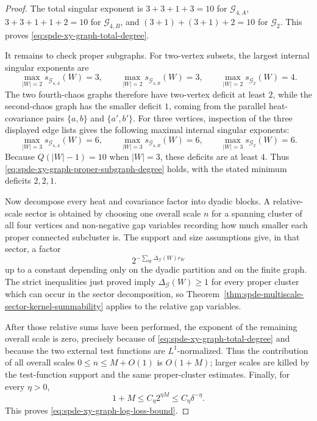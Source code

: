 \begin{proof}
The total singular exponent is \(3+3+1+3=10\) for
\(\mathcal G_{4,A}\), \(3+3+1+1+2=10\) for \(\mathcal G_{4,B}\), and
\((3+1)+(3+1)+2=10\) for \(\mathcal G_2\).  This proves
\eqref{eq:spde-xy-graph-total-degree}.

It remains to check proper subgraphs.  For two-vertex subsets, the largest
internal singular exponents are
\[
  \max_{|W|=2}s_{\mathcal G_{4,A}}(W)=3,\qquad
  \max_{|W|=2}s_{\mathcal G_{4,B}}(W)=3,\qquad
  \max_{|W|=2}s_{\mathcal G_2}(W)=4 .
\]
The two fourth-chaos graphs therefore have two-vertex deficit at least \(2\),
while the second-chaos graph has the smaller deficit \(1\), coming from the
parallel heat-covariance pairs \(\{a,b\}\) and \(\{a',b'\}\).  For three
vertices, inspection of the three displayed edge lists gives the following
maximal internal singular exponents:
\[
  \max_{|W|=3}s_{\mathcal G_{4,A}}(W)=6,\qquad
  \max_{|W|=3}s_{\mathcal G_{4,B}}(W)=6,\qquad
  \max_{|W|=3}s_{\mathcal G_2}(W)=6 .
\]
Because \(Q(|W|-1)=10\) when \(|W|=3\), these deficits are at least \(4\).
Thus \eqref{eq:spde-xy-graph-proper-subgraph-degree} holds, with the stated
minimum deficits \(2,2,1\).

Now decompose every heat and covariance factor into dyadic blocks.  A
relative-scale sector is obtained by choosing one overall scale \(n\) for a
spanning cluster of all four vertices and non-negative gap variables
recording how much smaller each proper connected subcluster is.  The support
and size assumptions give, in that sector, a factor
\[
  2^{-\sum_W \Delta_{\mathcal G}(W)r_W}
\]
up to a constant depending only on the dyadic partition and on the finite
graph.  The strict inequalities just proved imply
\(\Delta_{\mathcal G}(W)\geq1\) for every proper cluster which can occur in
the sector decomposition, so Theorem~\ref{thm:spde-multiscale-sector-kernel-summability}
applies to the relative gap variables.

After those relative sums have been performed, the exponent of the remaining
overall scale is zero, precisely because of
\eqref{eq:spde-xy-graph-total-degree} and because the two external test
functions are \(L^1\)-normalized.  Thus the contribution of all overall
scales \(0\leq n\leq M+O(1)\) is \(O(1+M)\); larger scales are killed by the
test-function support and the same proper-cluster estimates.  Finally, for
every \(\eta>0\),
\[
  1+M\leq C_\eta 2^{\eta M}\leq C_\eta\delta^{-\eta}.
\]
This proves \eqref{eq:spde-xy-graph-log-loss-bound}.
\end{proof}


